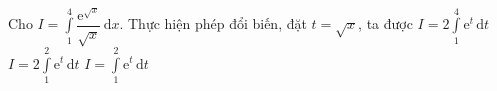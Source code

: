 \begin{ex}%
	Cho $I=\displaystyle\int\limits_1^4\dfrac{\mathrm{e}^{\sqrt{x}}}{\sqrt{x}}\mathrm{\, d}x$. Thực hiện phép đổi biến, đặt $t=\sqrt{x}$, ta được
	{$I=2\displaystyle\int\limits_1^4\mathrm{e}^t\mathrm{\, d}t$}
	{\True $I=2\displaystyle\int\limits_1^2\mathrm{e}^t\mathrm{\, d}t$}
	{$I=\displaystyle\int\limits_1^2\mathrm{e}^t\mathrm{\, d}t$}
\end{ex}

